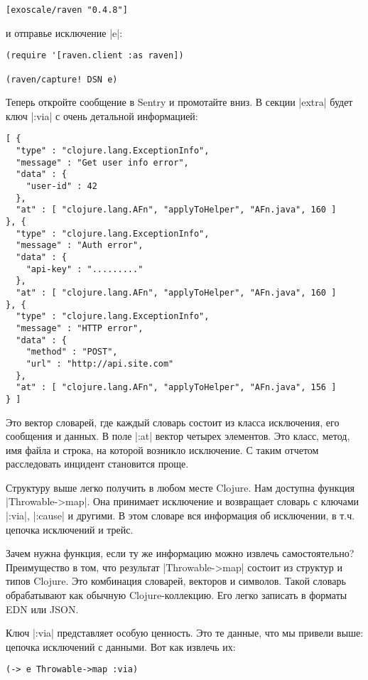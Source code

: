 \begin{verbatim}
[exoscale/raven "0.4.8"]
\end{verbatim}

и отправье исключение \spverb|e|:

\begin{verbatim}
(require '[raven.client :as raven])

(raven/capture! DSN e)
\end{verbatim}

Теперь откройте сообщение в Sentry и промотайте вниз. В секции \spverb|extra| будет
ключ \spverb|:via| с очень детальной информацией:

\begin{verbatim}
[ {
  "type" : "clojure.lang.ExceptionInfo",
  "message" : "Get user info error",
  "data" : {
    "user-id" : 42
  },
  "at" : [ "clojure.lang.AFn", "applyToHelper", "AFn.java", 160 ]
}, {
  "type" : "clojure.lang.ExceptionInfo",
  "message" : "Auth error",
  "data" : {
    "api-key" : "........."
  },
  "at" : [ "clojure.lang.AFn", "applyToHelper", "AFn.java", 160 ]
}, {
  "type" : "clojure.lang.ExceptionInfo",
  "message" : "HTTP error",
  "data" : {
    "method" : "POST",
    "url" : "http://api.site.com"
  },
  "at" : [ "clojure.lang.AFn", "applyToHelper", "AFn.java", 156 ]
} ]
\end{verbatim}

Это вектор словарей, где каждый словарь состоит из класса исключения, его
сообщения и данных. В поле \spverb|:at| вектор четырех элементов. Это класс, метод, имя
файла и строка, на которой возникло исключение. С таким отчетом расследовать
инцидент становится проще.

Структуру выше легко получить в любом месте Clojure. Нам доступна функция
\spverb|Throwable->map|. Она принимает исключение и возвращает словарь с ключами
\spverb|:via|, \spverb|:cause| и другими. В этом словаре вся информация об исключении, в
т.ч. цепочка исключений и трейс.

Зачем нужна функция, если ту же информацию можно извлечь самостоятельно?
Преимущество в том, что результат \spverb|Throwable->map| состоит из структур и типов
Clojure. Это комбинация словарей, векторов и символов. Такой словарь
обрабатывают как обычную Clojure-коллекцию. Его легко записать в форматы EDN или
JSON.

Ключ \spverb|:via| представляет особую ценность. Это те данные, что мы привели выше:
цепочка исключений с данными. Вот как извлечь их:

\begin{verbatim}
(-> e Throwable->map :via)
\end{verbatim}

